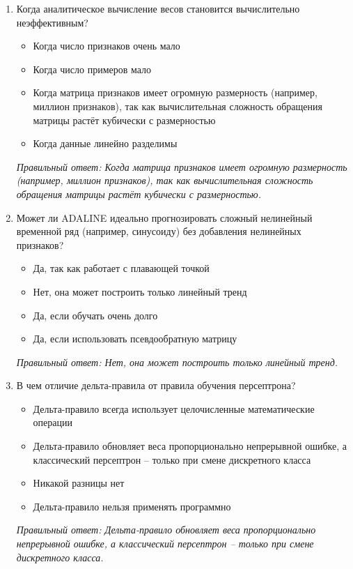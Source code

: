\begin{enumerate}[label=\textbf{\arabic*.}, leftmargin=0pt, itemsep=1.2em]
\item Когда аналитическое вычисление весов становится вычислительно неэффективным?
\begin{itemize}[label=$\square$, leftmargin=1.5cm, itemsep=0.2em, topsep=0.3em]
\item Когда число признаков очень мало
\item Когда число примеров мало
\item Когда матрица признаков имеет огромную размерность (например, миллион признаков), так как вычислительная сложность обращения матрицы растёт кубически с размерностью
\item Когда данные линейно разделимы
\end{itemize}
{\small\textit{Правильный ответ: Когда матрица признаков имеет огромную размерность (например, миллион признаков), так как вычислительная сложность обращения матрицы растёт кубически с размерностью.}}

\item Может ли ADALINE идеально прогнозировать сложный нелинейный временной ряд (например, синусоиду) без добавления нелинейных признаков?
\begin{itemize}[label=$\square$, leftmargin=1.5cm, itemsep=0.2em, topsep=0.3em]
\item Да, так как работает с плавающей точкой
\item Нет, она может построить только линейный тренд
\item Да, если обучать очень долго
\item Да, если использовать псевдообратную матрицу
\end{itemize}
{\small\textit{Правильный ответ: Нет, она может построить только линейный тренд.}}

\item В чем отличие дельта-правила от правила обучения персептрона?
\begin{itemize}[label=$\square$, leftmargin=1.5cm, itemsep=0.2em, topsep=0.3em]
\item Дельта-правило всегда использует целочисленные математические операции
\item Дельта-правило обновляет веса пропорционально непрерывной ошибке, а классический персептрон – только при смене дискретного класса
\item Никакой разницы нет
\item Дельта-правило нельзя применять программно
\end{itemize}
{\small\textit{Правильный ответ: Дельта-правило обновляет веса пропорционально непрерывной ошибке, а классический персептрон – только при смене дискретного класса.}}


\end{enumerate}
